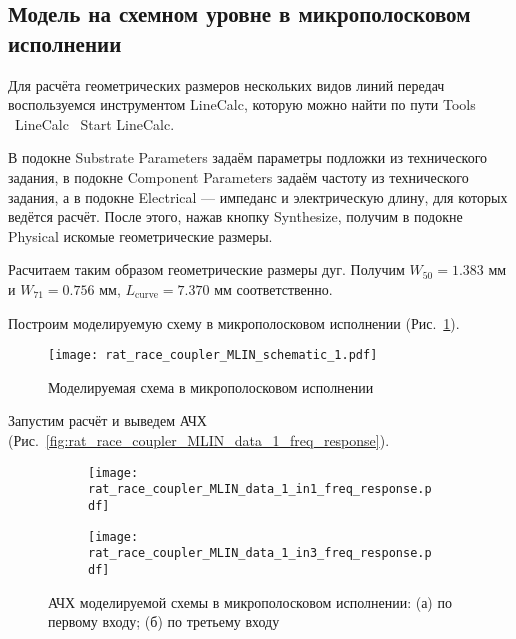 \subsection{Модель на схемном уровне в микрополосковом исполнении}

Для расчёта геометрических размеров нескольких видов линий передач воспользуемся инструментом LineCalc, которую можно найти по пути Tools \textrightarrow\ LineCalc \textrightarrow\ Start LineCalc.

В подокне Substrate Parameters задаём параметры подложки из технического задания, в подокне Component Parameters задаём частоту из технического задания, а в подокне Electrical --- импеданс и электрическую длину, для которых ведётся расчёт.
После этого, нажав кнопку Synthesize, получим в подокне Physical искомые геометрические размеры.

Расчитаем таким образом геометрические размеры дуг.
Получим $W_{50} = 1.383 \text{~мм}$ и $W_{71} = 0.756 \text{~мм}$, $L_\text{curve} = 7.370 \text{~мм}$ соответственно.

Построим моделируемую схему в микрополосковом исполнении (Рис.~\ref{fig:rat_race_coupler_MLIN_schematic_1}).

\begin{figure}[!ht]
    \centering
    \texttt{[image: rat\_race\_coupler\_MLIN\_schematic\_1.pdf]}
    \caption{Моделируемая схема в микрополосковом исполнении}%
    \label{fig:rat_race_coupler_MLIN_schematic_1}
\end{figure}

Запустим расчёт и выведем АЧХ (Рис.~\ref{fig:rat_race_coupler_MLIN_data_1_freq_response}).

\begin{figure}[!ht]
    \begin{subfigure}[b]{0.45\textwidth}
        \centering
        \texttt{[image: rat\_race\_coupler\_MLIN\_data\_1\_in1\_freq\_response.pdf]}
        \caption{}%
    \label{fig:rat_race_coupler_MLIN_data_1_in1_freq_response}
    \end{subfigure}
    \hfill
    \begin{subfigure}[b]{0.45\textwidth}
        \centering
        \texttt{[image: rat\_race\_coupler\_MLIN\_data\_1\_in3\_freq\_response.pdf]}
        \caption{}%
    \label{fig:rat_race_coupler_MLIN_data_1_in3_freq_response}
    \end{subfigure}
    \caption{%
        АЧХ моделируемой схемы в микрополосковом исполнении:
        (а) по первому входу;
        (б) по третьему входу
    }%
    \label{fig:rat_race_coupler_data_1_freq_response}
\end{figure}

